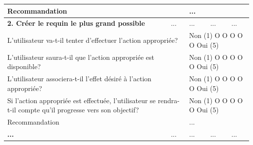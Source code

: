 \documentclass{article}
\begin{document}
\begin{table}[h]
\begin{tabular}{|p{6cm}|p{1.5cm}|p{1.5cm}|p{2.5cm}|p{3.5cm}|}
		\multicolumn{2}{|p{7.5cm}|}{Recommandation}                                                                                               & \multicolumn{3}{p{7.5cm}|}{...}                                                                                                             \\ \hline
		\textbf{2. Créer le requin le plus grand possible}                                                                                        & ...                                                   & ...              & ...                                      & ...                   \\ \hline
		\multicolumn{2}{|p{7.5cm}|}{L’utilisateur va-t-il tenter d’effectuer l’action appropriée?}                                                & \multicolumn{3}{p{7.5cm}|}{Non (1) O O O O O Oui (5)}                                                                                       \\ \hline
		\multicolumn{2}{|p{7.5cm}|}{L’utilisateur saura-t-il que l’action appropriée est disponible?}                                             & \multicolumn{3}{p{7.5cm}|}{Non (1) O O O O O Oui (5)}                                                                                       \\ \hline
		\multicolumn{2}{|p{7.5cm}|}{L’utilisateur associera-t-il l’effet désiré à l’action appropriée?}                                           & \multicolumn{3}{p{7.5cm}|}{Non (1) O O O O O Oui (5)}                                                                                       \\ \hline
		\multicolumn{2}{|p{7.5cm}|}{Si l’action appropriée est effectuée, l’utilisateur se rendra-t-il compte qu’il progresse vers son objectif?} & \multicolumn{3}{p{7.5cm}|}{Non (1) O O O O O Oui (5)}                                                                                       \\ \hline
		\multicolumn{2}{|p{7.5cm}|}{Recommandation}                                                                                               & \multicolumn{3}{p{7.5cm}|}{...}                                                                                                             \\ \hline
		\textbf{...}                                                                                                                              & ...                                                   & ...              & ...                                      & ...                   \\ \hline

\end{tabular}
\end{table}
\end{document}
